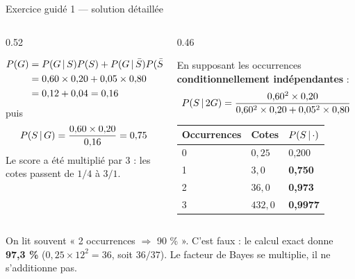 \begin{frame}{Exercice guidé 1 — solution détaillée}
\small
\begin{columns}[t]
\begin{column}{0.52\textwidth}
\begin{solbox}
\[
\begin{aligned}
P(G) &= P(G \,\vert\, S)P(S) + P(G \,\vert\, \bar S)P(\bar S)\\
     &= 0{,}60 \times 0{,}20 + 0{,}05 \times 0{,}80\\
     &= 0{,}12 + 0{,}04 = 0{,}16
\end{aligned}
\]
puis
\[
P(S \,\vert\, G) = \frac{0{,}60 \times 0{,}20}{0{,}16} = 0{,}75
\]
Le score a été multiplié par 3 : les cotes passent de $1/4$ à $3/1$.
\end{solbox}
\end{column}
\begin{column}{0.46\textwidth}
\begin{ebox}
En supposant les occurrences \textbf{conditionnellement indépendantes} :
\[
P(S \,\vert\, 2G) = \frac{0{,}60^2 \times 0{,}20}{0{,}60^2 \times 0{,}20 + 0{,}05^2 \times 0{,}80}
\]
\centering
\begin{tabular}{@{}lll@{}}
\toprule
Occurrences & Cotes & $P(S \,\vert\, \cdot)$ \\
\midrule
0 & $0{,}25$ & 0,200 \\
1 & $3{,}0$ & \textbf{0,750} \\
2 & $36{,}0$ & \textbf{0,973} \\
3 & $432{,}0$ & \textbf{0,9977} \\
\bottomrule
\end{tabular}
\end{ebox}
\end{column}
\end{columns}
\vspace{1mm}
\begin{wbox}
On lit souvent « 2 occurrences $\Rightarrow$ 90 \% ». C'est faux : le calcul exact donne
\textbf{97,3 \%} ($0{,}25 \times 12^2 = 36$, soit $36/37$). Le facteur de Bayes se multiplie,
il ne s'additionne pas.
\end{wbox}
\end{frame}

